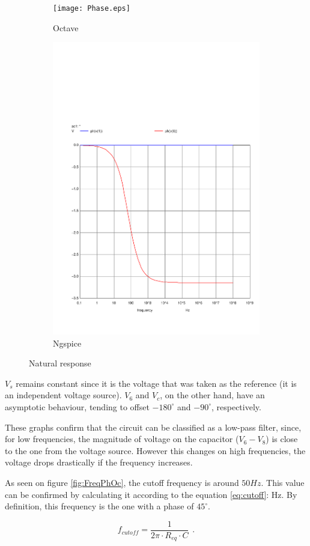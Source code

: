 \begin{figure}[H]
\centering
\begin{subfigure}{.5\textwidth}
  \centering
  \texttt{[image: Phase.eps]}
  \caption{Octave}
\end{subfigure}%
\begin{subfigure}{.5\textwidth}
  \centering
  \includegraphics[width=.8\linewidth]{../Simulation/acph.pdf}
  \caption{Ngspice}
\end{subfigure}
\caption{Natural response}
\label{fig:test}
\end{figure}



$V_s$ remains constant since it is the voltage that was taken as the reference (it is an independent voltage source). $V_6$ and $V_c$, on the other hand, have an asymptotic behaviour, tending to offset $-180^\circ$ and $-90^\circ$, respectively.

These graphs confirm that the circuit can be classified as a low-pass filter, since, for low frequencies, the magnitude of voltage on the capacitor ($V_6-V_8$) is close to the one from the voltage source. However this changes on high frequencies, the voltage drops drastically if the frequency increases.

As seen on figure \ref{fig:FreqPhOc}, the cutoff frequency is around $50 Hz$. This value can be confirmed by calculating it according to the equation \ref{eq:cutoff}:  Hz. By definition, this frequency is the one with a phase of $45^\circ$.

\begin{equation}
    f_{cutoff} = \frac{1}{2\pi \cdot R_{eq} \cdot C} \hspace{5pt}.
    \label{eq:cutoff}
\end{equation}
